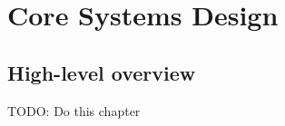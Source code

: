 \chapter{Core Systems Design}
\label{cha:core_system_design}
\section{High-level overview}



TODO: Do this chapter
